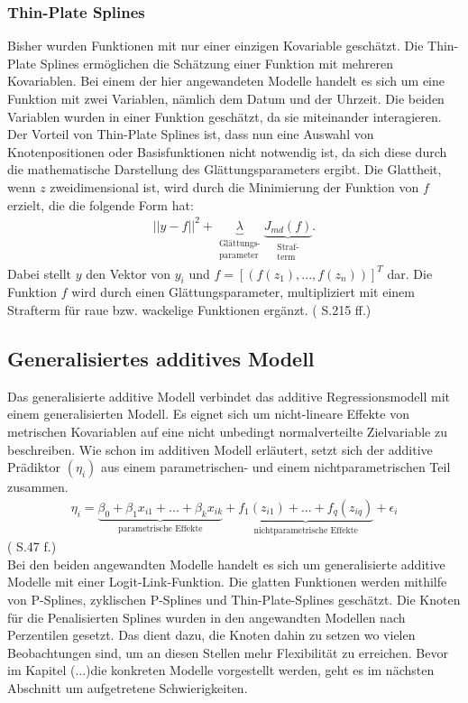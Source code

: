 \documentclass[12pt]{scrreprt}
\begin{document}
\subsubsection{Thin-Plate Splines}
Bisher wurden Funktionen mit nur einer einzigen Kovariable geschätzt. Die Thin-Plate Splines ermöglichen die Schätzung einer Funktion mit mehreren Kovariablen. Bei einem der hier angewandeten Modelle handelt es sich um eine Funktion mit zwei Variablen, nämlich dem Datum und der Uhrzeit. Die beiden Variablen wurden in einer Funktion geschätzt, da sie miteinander interagieren. Der Vorteil von Thin-Plate Splines ist, dass nun eine Auswahl von Knotenpositionen oder Basisfunktionen nicht notwendig ist, da sich diese durch die mathematische Darstellung des Glättungsparameters ergibt. Die Glattheit, wenn $z$ zweidimensional ist, wird durch die Minimierung der Funktion von $f$ erzielt, die die folgende Form hat:
\begin{align}
||y-f||^2+\underbrace{\lambda}_{\substack{\text{Glättungs-} \\ \text{parameter}}} \underbrace{J_{md}(f)}_{\substack{\text{Straf-} \\ \text{term}}}.
\end{align}
Dabei stellt $y$ den Vektor von $y_{i}$ und $f=[(f(z_{1}),...,f(z_{n}))]^T$ dar. Die Funktion $f$ wird durch einen Glättungsparameter, multipliziert mit einem Strafterm für raue bzw. wackelige Funktionen ergänzt. (\cite{wood2017generalized} S.215 ff.)

\subsection{Generalisiertes additives Modell}
Das generalisierte additive Modell verbindet das additive Regressionsmodell mit einem generalisierten Modell.
Es eignet sich um nicht-lineare Effekte von metrischen Kovariablen auf eine nicht unbedingt normalverteilte Zielvariable zu beschreiben. Wie schon im additiven Modell erläutert, setzt sich der additive Prädiktor $(\eta_{i})$ aus einem parametrischen- und einem nichtparametrischen Teil zusammen.
\begin{align}
\eta_{i}=\underbrace{\beta_{0}+\beta_{1}x_{i1}+...+\beta_{k}x_{ik}}_{\text{parametrische Effekte}}+ \underbrace{f_{1}(z_{i1})+...+f_{q}(z_{iq})}_{\text{nichtparametrische Effekte}}+\epsilon_{i}
\end{align}
(\cite{fahrmeir2007regression} S.47 f.) \\
Bei den beiden angewandten Modelle handelt es sich um generalisierte additive Modelle mit einer Logit-Link-Funktion. Die glatten Funktionen werden mithilfe von P-Splines, zyklischen P-Splines und Thin-Plate-Splines geschätzt. Die Knoten für die Penalisierten Splines wurden in den angewandten Modellen nach Perzentilen gesetzt. Das dient dazu, die Knoten dahin zu setzen wo vielen Beobachtungen sind, um an diesen Stellen mehr Flexibilität zu erreichen. Bevor im Kapitel (...)die konkreten Modelle vorgestellt werden, geht es im nächsten Abschnitt um aufgetretene Schwierigkeiten.
\end{document}
